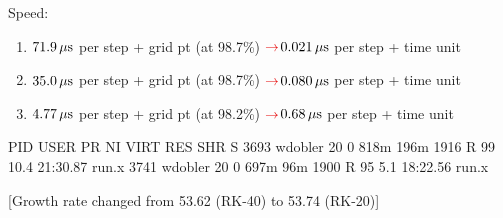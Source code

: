 \documentclass[\mydriver,12pt,twoside,notitlepage]{article}
\newcommand{\BoxLabel}[1]{\fbox{\rmfamily\emph{#1}}}
\newcommand{\ColEmph}[1]{{\color{DarkishRed}#1}}
\newcommand{\RedArrow}{\ensuremath{\ColEmph{\rightarrow}}}
\begin{document}
Speed:
\begin{enumerate}
\item $\unit[71.9]{\mu s}$ per step + grid pt   
  (at 98.7\%)
  \RedArrow $\unit[0.021]{\mu s}$ per step + time unit
\item $\unit[35.0]{\mu s}$ per step + grid pt
  (at 98.7\%)
  \RedArrow $\unit[0.080]{\mu s}$ per step + time unit
\item $\unit[4.77]{\mu s}$ per step + grid pt
  (at 98.2\%)
  \RedArrow $\unit[0.68]{\mu s}$ per step + time unit
\end{enumerate}
\bigskip

{\small\color{DarkBlue}
\begin{CodeVerbatim}[label=\BoxLabel{top}]
   PID USER      PR  NI  VIRT  RES  SHR S %
  3693 wdobler   20   0  818m 196m 1916 R   99 10.4  21:30.87 run.x              
  3741 wdobler   20   0  697m  96m 1900 R   95  5.1  18:22.56 run.x              
\end{CodeVerbatim}
}


[Growth rate changed from 53.62 (RK-40) to 53.74 (RK-20)]





\end{document}
